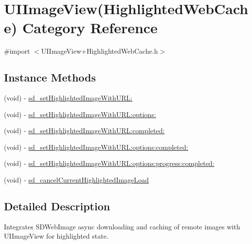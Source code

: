 \hypertarget{category_u_i_image_view_07_highlighted_web_cache_08}{}\section{U\+I\+Image\+View(Highlighted\+Web\+Cache) Category Reference}
\label{category_u_i_image_view_07_highlighted_web_cache_08}


{\ttfamily \#import $<$U\+I\+Image\+View+\+Highlighted\+Web\+Cache.\+h$>$}

\subsection*{Instance Methods}
\begin{DoxyCompactItemize}
\item 
(void) -\/ \hyperlink{category_u_i_image_view_07_highlighted_web_cache_08_aead947977bf9f935d00079ce090a394d}{sd\+\_\+set\+Highlighted\+Image\+With\+U\+R\+L\+:}
\item 
(void) -\/ \hyperlink{category_u_i_image_view_07_highlighted_web_cache_08_aa8728e14674fa23ba0df1eb31514d45c}{sd\+\_\+set\+Highlighted\+Image\+With\+U\+R\+L\+:options\+:}
\item 
(void) -\/ \hyperlink{category_u_i_image_view_07_highlighted_web_cache_08_a6d54e71346e25f580cc2f0e05a166cd4}{sd\+\_\+set\+Highlighted\+Image\+With\+U\+R\+L\+:completed\+:}
\item 
(void) -\/ \hyperlink{category_u_i_image_view_07_highlighted_web_cache_08_a5cf3bfb1b33bd229ed201025114837c5}{sd\+\_\+set\+Highlighted\+Image\+With\+U\+R\+L\+:options\+:completed\+:}
\item 
(void) -\/ \hyperlink{category_u_i_image_view_07_highlighted_web_cache_08_ad950cb8616b6c08477ea699581f8a679}{sd\+\_\+set\+Highlighted\+Image\+With\+U\+R\+L\+:options\+:progress\+:completed\+:}
\item 
(void) -\/ \hyperlink{category_u_i_image_view_07_highlighted_web_cache_08_aa7a59df2fc670e4fe5e4e7928e8e4485}{sd\+\_\+cancel\+Current\+Highlighted\+Image\+Load}
\end{DoxyCompactItemize}


\subsection{Detailed Description}
Integrates S\+D\+Web\+Image async downloading and caching of remote images with U\+I\+Image\+View for highlighted state. 

